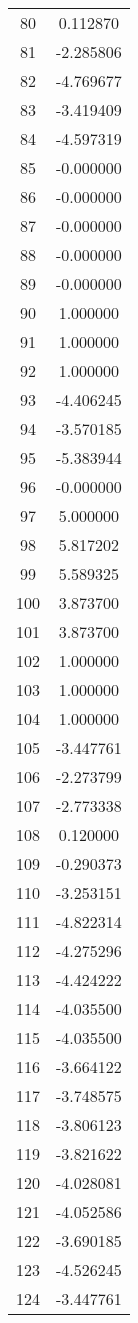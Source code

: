 \documentclass[12pt]{article}
\begin{document}
\begin{longtable}{@{}cc@{}}
80 & 0.112870 \\
81 & -2.285806 \\
82 & -4.769677 \\
83 & -3.419409 \\
84 & -4.597319 \\
85 & -0.000000 \\
86 & -0.000000 \\
87 & -0.000000 \\
88 & -0.000000 \\
89 & -0.000000 \\
90 & 1.000000 \\
91 & 1.000000 \\
92 & 1.000000 \\
93 & -4.406245 \\
94 & -3.570185 \\
95 & -5.383944 \\
96 & -0.000000 \\
97 & 5.000000 \\
98 & 5.817202 \\
99 & 5.589325 \\
100 & 3.873700 \\
101 & 3.873700 \\
102 & 1.000000 \\
103 & 1.000000 \\
104 & 1.000000 \\
105 & -3.447761 \\
106 & -2.273799 \\
107 & -2.773338 \\
108 & 0.120000 \\
109 & -0.290373 \\
110 & -3.253151 \\
111 & -4.822314 \\
112 & -4.275296 \\
113 & -4.424222 \\
114 & -4.035500 \\
115 & -4.035500 \\
116 & -3.664122 \\
117 & -3.748575 \\
118 & -3.806123 \\
119 & -3.821622 \\
120 & -4.028081 \\
121 & -4.052586 \\
122 & -3.690185 \\
123 & -4.526245 \\
124 & -3.447761 \\

\end{longtable}
\end{document}
